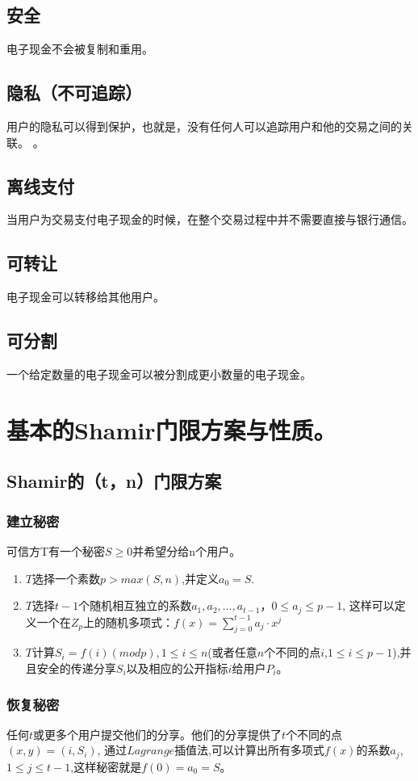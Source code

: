 \documentclass[11pt,a4paper]{article}
\begin{document}
\subsection{安全}电子现金不会被复制和重用。
\subsection{隐私（不可追踪）}用户的隐私可以得到保护，也就是，没有任何人可以追踪用户和他的交易之间的关联。
。
\subsection{离线支付}当用户为交易支付电子现金的时候，在整个交易过程中并不需要直接与银行通信。

\subsection{可转让}电子现金可以转移给其他用户。
\subsection{可分割}一个给定数量的电子现金可以被分割成更小数量的电子现金。
\section{基本的Shamir门限方案与性质。}

\subsection{Shamir的（t，n）门限方案}
\subsubsection{建立秘密} 可信方T有一个秘密$S\ge0$并希望分给n个用户。
\begin{enumerate}[1)]
\item $T$选择一个素数$p > max(S,n)$,并定义$a_0 = S$.
\item $T$选择$t-1$个随机相互独立的系数$a_1,a_2,\dots,a_{t-1}$，$0 \le a_j \le p-1$,
这样可以定义一个在$Z_p$上的随机多项式：$f(x)= \sum_{j=0}^{t-1}a_j· x^j$
\item $T$计算$S_i = f(i)(mod p) , 1 \le i \le n$(或者任意$n$个不同的点$i$,$1 \le i \le p-1$),并且安全的传递分享$S_i$以及相应的公开指标$i$给用户$P_i$。
\end{enumerate}

\subsubsection{恢复秘密} 任何$t$或更多个用户提交他们的分享。他们的分享提供了$t$个不同的点$(x,y)=(i, S_i)$, 通过$Lagrange$插值法,可以计算出所有多项式$f(x)$的系数$a_j$,$1 \le j \le t-1$,这样秘密就是$f(0)=a_0=S$。
\end{document}
